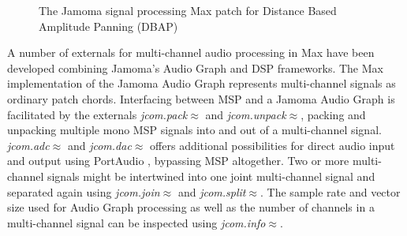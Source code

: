 \documentclass[twoside,a4paper]{article}
\begin{document}
\begin{figure}[!t]
\centering
{} \hspace{0.4cm}
\caption{The Jamoma signal processing Max patch for Distance Based Amplitude Panning (DBAP)}
\label{fig:max-before-after}
\end{figure}

A number of externals for multi-channel audio processing in Max have been developed combining Jamoma's Audio Graph and DSP frameworks. 
The Max implementation of the Jamoma Audio Graph represents multi-channel signals as ordinary patch chords.
Interfacing between MSP and a Jamoma Audio Graph is facilitated by the externals \emph{jcom.pack$\approx$} and \emph{jcom.unpack$\approx$}, packing and unpacking multiple mono MSP signals into and out of a multi-channel signal. 
\emph{jcom.adc$\approx$} and \emph{jcom.dac$\approx$} offers additional possibilities for direct audio input and output using PortAudio \cite{Bencina:2003}, bypassing MSP altogether. 
Two or more multi-channel signals might be intertwined into one joint multi-channel signal and separated again using \emph{jcom.join$\approx$} and \emph{jcom.split$\approx$}.
The sample rate and vector size used for Audio Graph processing as well as the number of channels in a multi-channel signal can be inspected using \emph{jcom.info$\approx$}.
\end{document}
